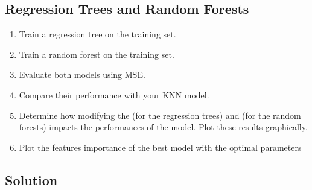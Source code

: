 \documentclass[letterpaper,10pt,english]{jupyterBook}
\begin{document}
\subsection{Regression Trees and Random Forests}
\label{\detokenize{03:regression-trees-and-random-forests}}\begin{enumerate}
%
\item {} 
\sphinxAtStartPar
Train a regression tree on the training set.

\item {} 
\sphinxAtStartPar
Train a random forest on the training set.

\item {} 
\sphinxAtStartPar
Evaluate both models using MSE.

\item {} 
\sphinxAtStartPar
Compare their performance with your KNN model.

\item {} 
\sphinxAtStartPar
Determine how modifying the  (for the regression trees) and  (for the random forests) impacts the performances of the model. Plot these results graphically.

\item {} 
\sphinxAtStartPar
Plot the features importance of the best model with the optimal parameters

\end{enumerate}


\subsection{Solution}
\label{\detokenize{03:id4}}
\end{document}
